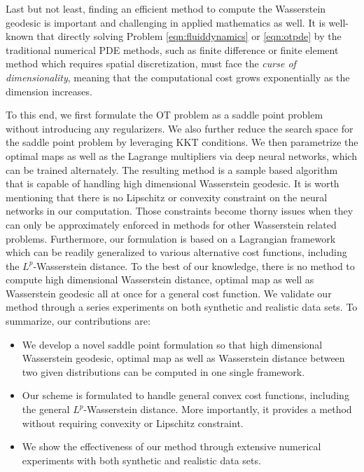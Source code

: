 \documentclass{article}
\begin{document}
Last but not least, finding an efficient method to compute the Wasserstein geodesic is important and challenging in applied mathematics as well. It is well-known that  directly solving Problem \eqref{eqn:fluiddynamics} or \eqref{eqn:otpde} by the traditional numerical PDE methods, such as finite difference or finite element method which requires spatial discretization, must face the {\it curse of dimensionality}, meaning that the computational cost grows exponentially as the dimension increases.

To this end, we first formulate the OT problem as a saddle point problem without introducing any regularizers. We also further reduce the search space for the saddle point problem by leveraging KKT conditions. We then parametrize the optimal maps as well as the Lagrange multipliers via deep neural networks, which can be trained alternately. The resulting method is a sample based algorithm that is capable of handling high dimensional Wasserstein geodesic. It is worth mentioning that there is no Lipschitz or convexity constraint on the neural networks in our computation. Those constraints become thorny issues when they can only be approximately enforced in methods for other Wasserstein related problems. Furthermore, our formulation is based on a Lagrangian framework which can be readily generalized to various alternative cost functions, including the $L^p$-Wasserstein distance. To the best of our knowledge, there is no method to compute high dimensional Wasserstein distance, optimal map as well as Wasserstein geodesic all at once for a general cost function. We validate our method through a series experiments on both synthetic and realistic data sets. To summarize, our contributions are:
\begin{itemize}[leftmargin=*]
    \item We develop a novel saddle point formulation so that high dimensional Wasserstein geodesic, optimal map as well as Wasserstein distance between two given distributions can be computed in one single framework.
    \item Our scheme is formulated to handle general convex cost functions, including the general $L^p$-Wasserstein distance. More importantly, it provides a method without requiring convexity or Lipschitz constraint.
    \item We show the effectiveness of our method through extensive numerical experiments with both synthetic and realistic data sets. %
\end{itemize}
\end{document}
